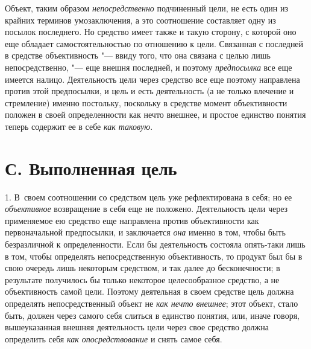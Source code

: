 Объект, таким образом
{\em непосредственно}
подчиненный цели, не есть один из крайних терминов
умозаключения, а это соотношение составляет одну из посылок последнего. Но
средство имеет также и такую сторону, с которой оно еще обладает
самостоятельностью по отношению к цели. Связанная с последней в средстве
объективность "--- ввиду того, что она связана с целью лишь
непосредственно, "--- еще внешня последней, и поэтому
{\em предпосылка} все еще
имеется налицо. Деятельность цели через средство все еще поэтому направлена
против этой предпосылки, и цель и есть деятельность (а не только влечение и
стремление) именно постольку, поскольку в средстве момент объективности
положен в своей определенности как нечто внешнее, и простое единство
понятия теперь содержит ее в себе
{\em как таковую}.

\section[С. Выполненная цель]{С. Выполненная цель }
1. В~своем соотношении со средством цель уже рефлектирована в
себя; но ее {\em объективное}
возвращение в себя еще не положено. Деятельность цели через
применяемое ею средство еще направлена против объективности как
первоначальной предпосылки, и заключается
{\em она} именно в том,
чтобы быть безразличной к определенности. Если бы деятельность состояла
опять-таки лишь в том, чтобы определять непосредственную объективность, то
продукт был бы в свою очередь лишь некоторым средством, и так далее до
бесконечности; в результате получилось бы только некоторое целесообразное
средство, а не объективность самой цели. Поэтому деятельная в своем
средстве цель должна определять непосредственный объект не
{\em как нечто внешнее};
этот объект, стало быть, должен через самого себя слиться в
единство понятия, или, иначе говоря, вышеуказанная внешняя деятельность
цели через свое средство должна определить себя
{\em как опосредствование}
и снять самое себя.

